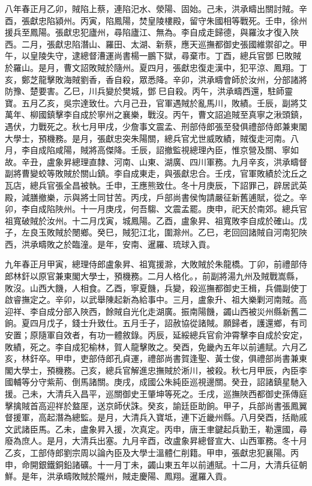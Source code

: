 \begin{pinyinscope}
八年春正月乙卯，賊陷上蔡，連陷汜水、滎陽、固始。己未，洪承疇出關討賊。辛酉，張獻忠陷潁州。丙寅，陷鳳陽，焚皇陵樓殿，留守朱國相等戰死。壬申，徐州援兵至鳳陽。張獻忠犯廬州，尋陷廬江、無為。李自成走歸德，與羅汝才復入陜西。二月，張獻忠陷潛山、羅田、太湖、新蔡，應天巡撫都御史張國維禦卻之。甲午，以皇陵失守，逮總督漕運尚書楊一鵬下獄，尋棄市。丁酉，總兵官鄧巳敗賊於羅山。是月，曹文詔敗賊於隨州。夏四月，張獻忠復走漢中，犯平涼、鳳翔。丁亥，鄭芝龍擊敗海賊劉香，香自殺，眾悉降。辛卯，洪承疇會師於汝州，分部諸將防豫、楚要害。乙巳，川兵變於樊城，鄧巳自殺。丙午，洪承疇西還，駐師靈寶。五月乙亥，吳宗達致仕。六月己丑，官軍遇賊於亂馬川，敗績。壬辰，副將艾萬年、柳國鎮擊李自成於寧州之襄樂，戰沒。丙午，曹文詔追賊至真寧之湫頭鎮，遇伏，力戰死之。秋七月甲戌，少詹事文震孟、刑部侍郎張至發俱禮部侍郎兼東閣大學士，預機務。是月，張獻忠突朱陽關，總兵官尤世威敗績，賊復走河南。八月，李自成陷咸陽，賊將高傑降。壬辰，詔撤監視總理內臣，惟京營及關、寧如故。辛丑，盧象昇總理直隸、河南、山東、湖廣、四川軍務。九月辛亥，洪承疇督副將曹變蛟等敗賊於關山鎮。李自成東走，與張獻忠合。壬戌，官軍敗績於沈丘之瓦店，總兵官張全昌被執。壬申，王應熊致仕。冬十月庚辰，下詔罪己，辟居武英殿，減膳撤樂，示與將士同甘苦。丙戌，戶部尚書侯恂請嚴征新舊逋賦，從之。辛卯，李自成陷陜州。十一月庚戌，何吾騶、文震孟罷。庚申，祀天於南郊。總兵官祖寬破賊於汝州。十二月戊寅，城鳳陽。乙酉，盧象昇、祖寬敗李自成於確山。戊子，左良玉敗賊於閿鄉。癸巳，賊犯江北，圍滁州。乙巳，老回回諸賊自河南犯陜西，洪承疇敗之於臨潼。是年，安南、暹羅、琉球入貢。

九年春正月甲寅，總理侍郎盧象昇、祖寬援滁，大敗賊於朱龍橋。丁卯，前禮部侍郎林釬以原官兼東閣大學士，預機務。二月人格化。，前副將湯九州及賊戰嵩縣，敗沒。山西大饑，人相食。乙酉，寧夏饑，兵變，殺巡撫都御史王楫，兵備副使丁啟睿撫定之。辛卯，以武舉陳起新為給事中。三月，盧象升、祖大樂剿河南賊。高迎祥、李自成分部入陜西，餘賊自光化走湖廣。振南陽饑，蠲山西被災州縣新舊二餉。夏四月戊子，錢士升致仕。五月壬子，詔赦協從諸賊。願歸者，護還鄉，有司安置；原隨軍自效者，有功一體敘錄。丙辰，延綏總兵官俞沖霄擊李自成於安定，敗績，死之。李自成犯榆林，賀人龍擊敗之。癸酉，免畿內五年以前逋賦。六月乙亥，林釬卒。甲申，吏部侍郎孔貞運，禮部尚書賀逢聖、黃士俊，俱禮部尚書兼東閣大學士，預機務。己亥，總兵官解進忠撫賊於淅川，被殺。秋七月甲辰，內臣李國輔等分守紫荊、倒馬諸關。庚戌，成國公朱純臣巡視邊關。癸丑，詔諸鎮星馳入援。己未，大清兵入昌平，巡關御史王肇坤等死之。壬戌，巡撫陜西都御史孫傳庭擊擒賊首高迎祥於盩厔，送京師伏誅。癸亥，諭廷臣助餉。甲子，兵部尚書張鳳翼督援軍，高起潛為總監。是月，大清兵入寶坻，連下近畿州縣。八月癸酉，括勛戚文武諸臣馬。乙未，盧象昇入援，次真定。丙申，唐王聿鍵起兵勤王，勒還國，尋廢為庶人。是月，大清兵出塞。九月辛酉，改盧象昇總督宣大、山西軍務。冬十月乙亥，工部侍郎劉宗周以論內臣及大學士溫體仁削籍。甲申，張獻忠犯襄陽。丙申，命開銀鐵銅鉛諸礦。十一月丁未，蠲山東五年以前逋賦。十二月，大清兵征朝鮮。是年，洪承疇敗賊於隴州，賊走慶陽、鳳翔。暹羅入貢。


\end{pinyinscope}
